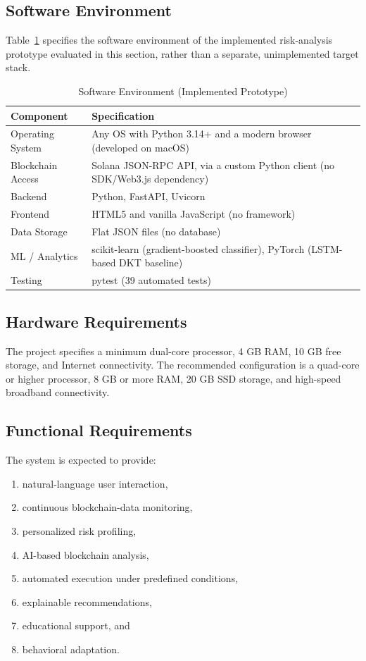 \documentclass[conference]{IEEEtran}
\begin{document}
\subsection{Software Environment}

Table~\ref{tab:software} specifies the software environment of the implemented risk-analysis prototype evaluated in this section, rather than a separate, unimplemented target stack.

\begin{table}[t]
\caption{Software Environment (Implemented Prototype)}
\label{tab:software}
\centering
\small
\begin{tabularx}{\columnwidth}{l X}
\toprule
\textbf{Component} & \textbf{Specification}\\
\midrule
Operating System & Any OS with Python 3.14+ and a modern browser (developed on macOS)\\
Blockchain Access & Solana JSON-RPC API, via a custom Python client (no SDK/Web3.js dependency)\\
Backend & Python, FastAPI, Uvicorn\\
Frontend & HTML5 and vanilla JavaScript (no framework)\\
Data Storage & Flat JSON files (no database)\\
ML / Analytics & scikit-learn (gradient-boosted classifier), PyTorch (LSTM-based DKT baseline)\\
Testing & pytest (39 automated tests)\\
\bottomrule
\end{tabularx}
\end{table}

\subsection{Hardware Requirements}

The project specifies a minimum dual-core processor, 4 GB RAM, 10 GB free storage, and Internet connectivity. The recommended configuration is a quad-core or higher processor, 8 GB or more RAM, 20 GB SSD storage, and high-speed broadband connectivity.

\subsection{Functional Requirements}

The system is expected to provide:
\begin{enumerate}
    \item natural-language user interaction,
    \item continuous blockchain-data monitoring,
    \item personalized risk profiling,
    \item AI-based blockchain analysis,
    \item automated execution under predefined conditions,
    \item explainable recommendations,
    \item educational support, and
    \item behavioral adaptation.
\end{enumerate}
\end{document}
